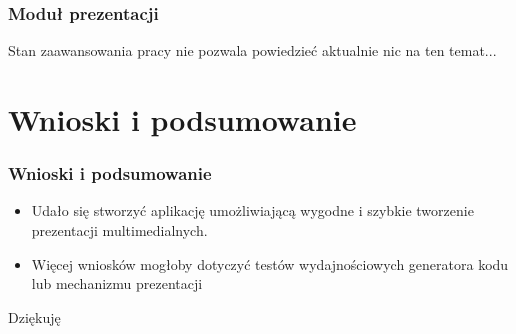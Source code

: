 \documentclass[t]{beamer}
\begin{document}
\begin{frame}
	\frametitle{Moduł prezentacji}
	\centering \alert{Stan zaawansowania pracy nie pozwala powiedzieć aktualnie nic na ten temat...}
\end{frame}

\section{Wnioski i podsumowanie}

\begin{frame}
	\frametitle{Wnioski i podsumowanie}
	\begin{itemize}
		\item Udało się stworzyć aplikację umożliwiającą wygodne i szybkie tworzenie prezentacji multimedialnych.
		\item \alert{Więcej wniosków mogłoby dotyczyć testów wydajnościowych generatora kodu lub mechanizmu prezentacji}
	\end{itemize}
\end{frame}

\begin{frame}[c]
	\Huge Dziękuję
\end{frame}
\end{document}
